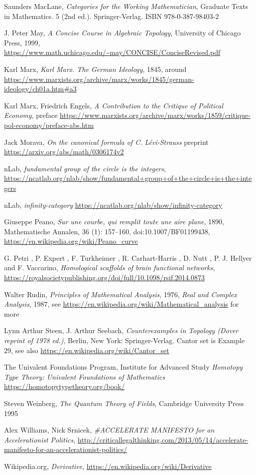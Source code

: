 \documentclass{article}
\begin{document}
\begin{thebibliography}{99}
 Saunders MacLane, \textit{Categories for the Working Mathematician}, Graduate Texts in Mathematics. 5 (2nd ed.). Springer-Verlag. ISBN 978-0-387-98403-2

 J. Peter May, \textit{A Concise Course in Algebraic Topology}, University of Chicago Press, 1999, \url{https://www.math.uchicago.edu/~may/CONCISE/ConciseRevised.pdf}

 Karl Marx, \textit{Karl Marx. The German Ideology}, 1845, around \url{https://www.marxists.org/archive/marx/works/1845/german-ideology/ch01a.htm#a3}

 Karl Marx, Friedrich Engels, \textit{A Contribution to the Critique of Political Economy}, preface \url{https://www.marxists.org/archive/marx/works/1859/critique-pol-economy/preface-abs.htm}

 Jack Morava, \textit{On the canonical formula of C. L\'evi-Strauss} preprint \url{https://arxiv.org/abs/math/0306174v2}

 nLab, \textit{fundamental group of the circle is the integers}, \url{https://ncatlab.org/nlab/show/fundamental+group+of+the+circle+is+the+integers}

 nLab, \textit{infinity-category} \url{https://ncatlab.org/nlab/show/infinity-category}

 Giuseppe Peano, \textit{Sur une courbe, qui remplit toute une aire plane}, 1890, Mathematische Annalen, 36 (1): 157–160, doi:10.1007/BF01199438, \url{https://en.wikipedia.org/wiki/Peano_curve}

 G. Petri , P. Expert , F. Turkheimer , R. Carhart-Harris , D. Nutt , P. J. Hellyer and F. Vaccarino, \textit{Homological scaffolds of brain functional networks}, \url{https://royalsocietypublishing.org/doi/full/10.1098/rsif.2014.0873}

 Walter Rudin, \textit{Principles of Mathematical Analysis}, 1976, \textit{Real and Complex Analysis}, 1987, see \url{https://en.wikipedia.org/wiki/Mathematical_analysis} for more

 Lynn Arthur Steen, J. Arthur Seebach, \textit{Counterexamples in Topology (Dover reprint of 1978 ed.)}, Berlin, New York: Springer-Verlag. Cantor set is Example 29, see also \url{https://en.wikipedia.org/wiki/Cantor_set}


 The Univalent Foundations Program,
Institute for Advanced Study \textit{Homotopy Type Theory:
Univalent Foundations of Mathematics} \url{https://homotopytypetheory.org/book/}

 Steven Weinberg, \textit{The Quantum Theory of Fields}, Cambridge University Press 1995

 Alex Williams, Nick Srnicek, \textit{\#ACCELERATE MANIFESTO for an Accelerationist Politics}, \url{http://criticallegalthinking.com/2013/05/14/accelerate-manifesto-for-an-accelerationist-politics/}



 Wikipedia.org, \textit{Derivative}, \url{https://en.wikipedia.org/wiki/Derivative}

\end{thebibliography}
\end{document}
